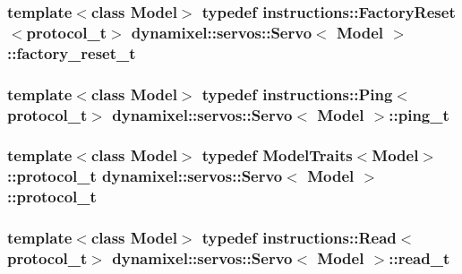 \subsubsection[{factory\+\_\+reset\+\_\+t}]{\setlength{\rightskip}{0pt plus 5cm}template$<$class Model$>$ typedef {\bf instructions\+::\+Factory\+Reset}$<${\bf protocol\+\_\+t}$>$ {\bf dynamixel\+::servos\+::\+Servo}$<$ Model $>$\+::{\bf factory\+\_\+reset\+\_\+t}}\label{classdynamixel_1_1servos_1_1_servo_abbf04a51c076bfbf234179bb59fd45a2}
\hypertarget{classdynamixel_1_1servos_1_1_servo_ae6ffa69927b65a1b73a52e80bcd07859}{}
\subsubsection[{ping\+\_\+t}]{\setlength{\rightskip}{0pt plus 5cm}template$<$class Model$>$ typedef {\bf instructions\+::\+Ping}$<${\bf protocol\+\_\+t}$>$ {\bf dynamixel\+::servos\+::\+Servo}$<$ Model $>$\+::{\bf ping\+\_\+t}}\label{classdynamixel_1_1servos_1_1_servo_ae6ffa69927b65a1b73a52e80bcd07859}
\hypertarget{classdynamixel_1_1servos_1_1_servo_a7718c41cee1187b992836f4b6bad8a38}{}
\subsubsection[{protocol\+\_\+t}]{\setlength{\rightskip}{0pt plus 5cm}template$<$class Model$>$ typedef {\bf Model\+Traits}$<$Model$>$\+::{\bf protocol\+\_\+t} {\bf dynamixel\+::servos\+::\+Servo}$<$ Model $>$\+::{\bf protocol\+\_\+t}}\label{classdynamixel_1_1servos_1_1_servo_a7718c41cee1187b992836f4b6bad8a38}
\hypertarget{classdynamixel_1_1servos_1_1_servo_a456a730b825adc0b7b295f567cf2947b}{}
\subsubsection[{read\+\_\+t}]{\setlength{\rightskip}{0pt plus 5cm}template$<$class Model$>$ typedef {\bf instructions\+::\+Read}$<${\bf protocol\+\_\+t}$>$ {\bf dynamixel\+::servos\+::\+Servo}$<$ Model $>$\+::{\bf read\+\_\+t}}\label{classdynamixel_1_1servos_1_1_servo_a456a730b825adc0b7b295f567cf2947b}
\hypertarget{classdynamixel_1_1servos_1_1_servo_adb8219ecc5a368a3222cf30cd17bb882}{}
